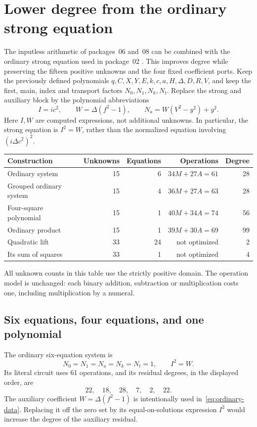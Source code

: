 \section{Lower degree from the ordinary strong equation}
\label{sec:ordinary-new}

The inputless arithmetic of packages~06 and~08 can be combined with the
ordinary strong equation used in package~02
\cite{src02,src06,src08}. This improves degree while preserving the
fifteen positive unknowns and the four fixed coefficient ports. Keep
the previously defined polynomials
\(q,C,X,Y,E,k,c,a,H,\Delta,D,R,V\), and keep the first, main, index and
transport factors \(N_0,N_1,N_k,N_t\). Replace the strong and auxiliary
block by the polynomial abbreviations
\begin{equation}\label{eq:ordinary-data}
 I=ic^2,\qquad W=\Delta(f^2-1),\qquad
 N_a=W(V^2-y^2)+y^2.
\end{equation}
Here \(I,W\) are computed expressions, not additional unknowns. In
particular, the strong equation is \(I^2=W\), rather than the
normalized equation involving \((i\Delta c^2)^2\).

\begin{center}
\begin{tabular}{@{}lrrrr@{}}
\toprule
Construction & Unknowns & Equations & Operations & Degree\\
\midrule
Ordinary system & 15 & 6 & \(34M+27A=61\) & 28\\
Grouped ordinary system & 15 & 4 & \(36M+27A=63\) & 28\\
Four-square polynomial & 15 & 1 & \(40M+34A=74\) & 56\\
Ordinary product & 15 & 1 & \(39M+30A=69\) & 99\\
Quadratic lift & 33 & 24 & not optimized & 2\\
Its sum of squares & 33 & 1 & not optimized & 4\\
\bottomrule
\end{tabular}
\end{center}
All unknown counts in this table use the strictly positive domain.
The operation model is unchanged: each binary addition, subtraction
or multiplication costs one, including multiplication by a numeral.

\subsection{Six equations, four equations, and one polynomial}

The ordinary six-equation system is
\begin{equation}\label{eq:ordinary-six}
 \boxed{N_0=N_1=N_a=N_k=N_t=1,\qquad I^2=W.}
\end{equation}
Its literal circuit uses 61 operations, and its residual degrees, in
the displayed order, are
\[
 22,\quad18,\quad28,\quad7,\quad2,\quad22.
\]
The auxiliary coefficient \(W=\Delta(f^2-1)\) is intentionally used
in~\eqref{eq:ordinary-data}. Replacing it off the zero set by its
equal-on-solutions expression \(I^2\) would increase the degree of
the auxiliary residual.

